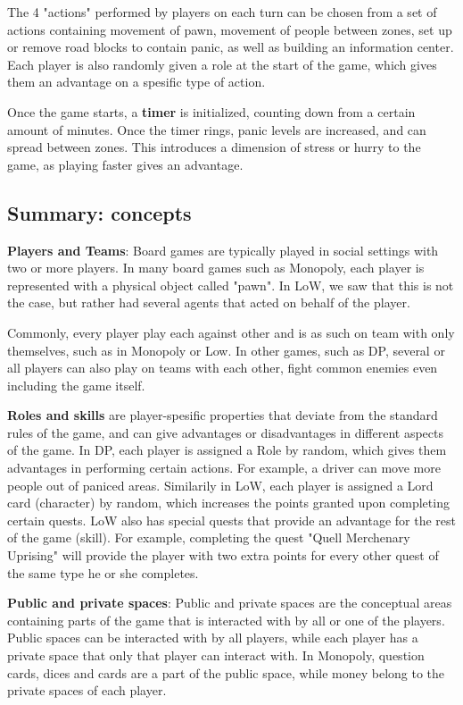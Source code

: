 The 4 "actions" performed by players on each turn can be chosen from a set of actions containing movement of pawn, movement of people between zones, set up or remove road blocks to contain panic, as well as building an information center. Each player is also randomly given a role at the start of the game, which gives them an advantage on a spesific type of action. 

Once the game starts, a \textbf{timer} is initialized, counting down from a certain amount of minutes. Once the timer rings, panic levels are increased, and can spread between zones. This introduces a dimension of stress or hurry to the game, as playing faster gives an advantage.

\subsection{Summary: concepts} \label{subsubsec:boardgame_concepts}
\textbf{Players and Teams}: Board games are typically played in social settings with two or more players. In many board games such as Monopoly, each player is represented with a physical object called "pawn". In LoW, we saw that this is not the case, but rather had several agents that acted on behalf of the player.

Commonly, every player play each against other and is as such on team with only themselves, such as in Monopoly or Low. In other games, such as DP, several or all players can also play on teams with each other, fight common enemies even including the game itself.

\textbf{Roles and skills} are player-spesific properties that deviate from the standard rules of the game, and can give advantages or disadvantages in different aspects of the game. In DP, each player is assigned a Role by random, which gives them advantages in performing certain actions. For example, a driver can move more people out of paniced areas. Similarily in LoW, each player is assigned a Lord card (character) by random, which increases the points granted upon completing certain quests. LoW also has special quests that provide an advantage for the rest of the game (skill). For example, completing the quest "Quell Merchenary Uprising" will provide the player with two extra points for every other quest of the same type he or she completes.

\textbf{Public and private spaces}: Public and private spaces are the conceptual areas containing parts of the game that is interacted with by all or one of the players. Public spaces can be interacted with by all players, while each player has a private space that only that player can interact with. In Monopoly, question cards, dices and cards are a part of the public space, while money belong to the private spaces of each player.

